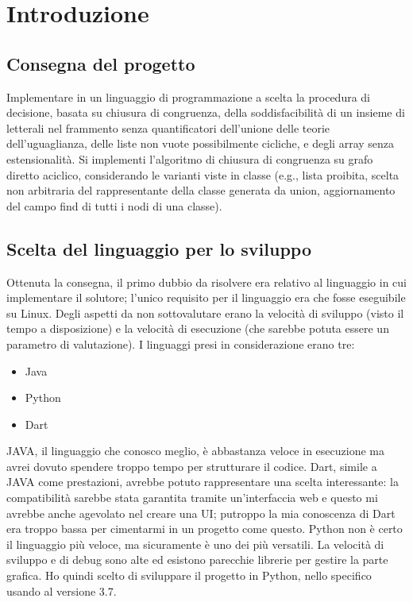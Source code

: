 \chapter{Introduzione}
\section{Consegna del progetto}
Implementare in un linguaggio di programmazione a scelta la procedura di decisione,
basata su chiusura di congruenza, della soddisfacibilità di un insieme di letterali nel
frammento senza quantificatori dell'unione delle teorie dell'uguaglianza, delle liste
non vuote possibilmente cicliche, e degli array senza estensionalità. Si implementi
l'algoritmo di chiusura di congruenza su grafo diretto aciclico, considerando le varianti
viste in classe (e.g., lista proibita, scelta non arbitraria del rappresentante della classe
generata da union, aggiornamento del campo find di tutti i nodi di una classe).
\section{Scelta del linguaggio per lo sviluppo}
Ottenuta la consegna, il primo dubbio da risolvere era relativo al linguaggio in cui implementare il solutore;
l'unico requisito per il linguaggio era che fosse eseguibile su Linux. Degli aspetti da non sottovalutare erano
la velocità di sviluppo (visto il tempo a disposizione) e la velocità di esecuzione (che sarebbe potuta essere un
parametro di valutazione). I linguaggi presi in considerazione erano tre:
\begin{itemize}
    \item Java
    \item Python
    \item Dart
\end{itemize}
JAVA, il linguaggio che conosco meglio, è abbastanza veloce in esecuzione ma avrei dovuto spendere troppo tempo per
strutturare il codice. Dart, simile a JAVA come prestazioni, avrebbe potuto rappresentare una scelta interessante: la
compatibilità sarebbe stata garantita tramite un'interfaccia web e questo mi avrebbe anche agevolato nel creare una UI;
putroppo la mia conoscenza di Dart era troppo bassa per cimentarmi in un progetto come questo. Python non è certo il
linguaggio più veloce, ma sicuramente è uno dei più versatili. La velocità di sviluppo e di debug sono alte ed esistono
parecchie librerie per gestire la parte grafica. Ho quindi scelto di sviluppare il progetto in Python, nello specifico
usando al versione 3.7.
